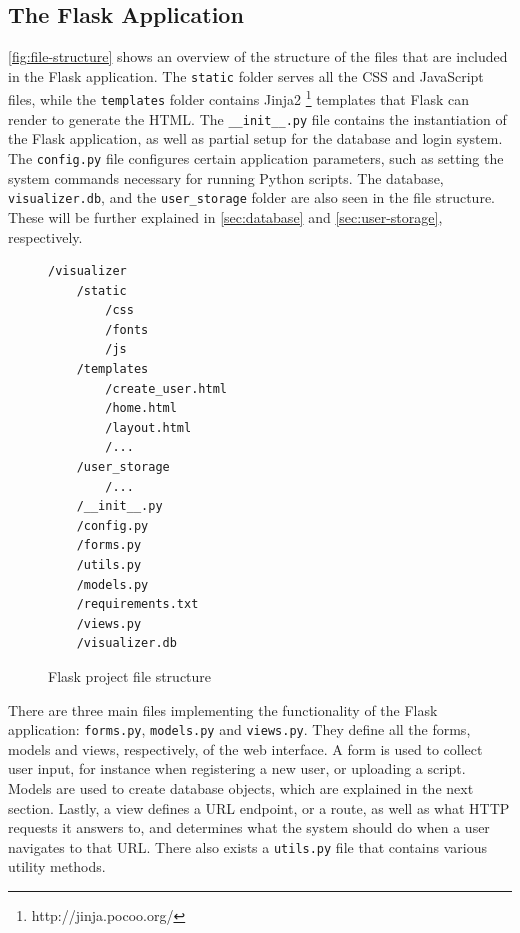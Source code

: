 \subsection{The Flask Application}

\autoref{fig:file-structure} shows an overview of the structure of the files that are included in the Flask application. The \texttt{static} folder serves all the CSS and JavaScript files, while the \texttt{templates} folder contains Jinja2 \footnote{http://jinja.pocoo.org/} templates that Flask can render to generate the HTML. The \texttt{\justify\_\_init\_\_.py} file contains the instantiation of the Flask application, as well as partial setup for the database and login system. The \texttt{config.py} file configures certain application parameters, such as setting the system commands necessary for running Python scripts. The database, \texttt{visualizer.db}, and the \texttt{user\_storage} folder are also seen in the file structure. These will be further explained in \autoref{sec:database} and \autoref{sec:user-storage}, respectively.\\

\begin{figure}[h!]
\begin{verbatim}
/visualizer
    /static
        /css
        /fonts
        /js
    /templates
        /create_user.html
        /home.html
        /layout.html
        /...
    /user_storage
        /...
    /__init__.py
    /config.py
    /forms.py
    /utils.py
    /models.py
    /requirements.txt
    /views.py
    /visualizer.db
\end{verbatim}
\caption{Flask project file structure}
\label{fig:file-structure}
\end{figure}

\noindent There are three main files implementing the functionality of the Flask application: \texttt{\justify forms.py}, \texttt{models.py} and \texttt{views.py}. They define all the forms, models and views, respectively, of the web interface. A form is used to collect user input, for instance when registering a new user, or uploading a script. Models are used to create database objects, which are explained in the next section. Lastly, a view defines a URL endpoint, or a route, as well as what HTTP requests it answers to, and determines what the system should do when a user navigates to that URL. There also exists a \texttt{utils.py} file that contains various utility methods. \\

